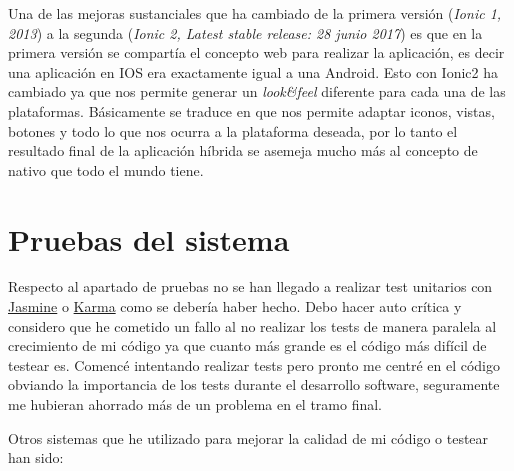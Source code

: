 

Una de las mejoras sustanciales que ha cambiado de la primera versión (\emph{Ionic 1, 2013}) a la segunda (\emph{Ionic 2, Latest stable release: 28 junio 2017}) es que en la primera versión se compartía el concepto web para realizar la aplicación, es decir una aplicación en IOS era exactamente igual a una Android. Esto con Ionic2 ha cambiado ya que nos permite generar un \emph{look\&feel} diferente para cada una de las plataformas. Básicamente se traduce en que nos permite adaptar iconos, vistas, botones y todo lo que nos ocurra a la plataforma deseada, por lo tanto el resultado final de la aplicación híbrida se asemeja mucho más al concepto de nativo que todo el mundo tiene.


\section{Pruebas del sistema}

Respecto al apartado de pruebas no se han llegado a realizar test unitarios con \href{https://jasmine.github.io/}{Jasmine} o \href{https://karma-runner.github.io/
}{Karma} como se debería haber hecho. Debo hacer auto crítica y considero que he cometido un fallo al no realizar los tests de manera paralela al crecimiento de mi código ya que cuanto más grande es el código más difícil de testear es. Comencé intentando realizar tests pero pronto me centré en el código obviando la importancia de los tests durante el desarrollo software, seguramente me hubieran ahorrado más de un problema en el tramo final. 

Otros sistemas que he utilizado para mejorar la calidad de mi código o testear han sido:

